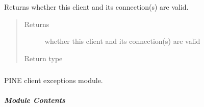 \documentclass[letterpaper,10pt,english]{sphinxmanual}
\begin{document}
\begin{fulllineitems}
\begin{fulllineitems}
\begin{quote}
\begin{description}
\end{description}\end{quote}

\end{fulllineitems}


\begin{fulllineitems}
\label{\detokenize{autoapi/pine/client/client/index:pine.client.client.LocalPineClient.is_valid}}
\sphinxAtStartPar
Returns whether this client and its connection(s) are valid.
\begin{quote}\begin{description}
\item[{Returns}] \leavevmode
\sphinxAtStartPar
whether this client and its connection(s) are valid

\item[{Return type}] \leavevmode
\sphinxAtStartPar
{}

\end{description}\end{quote}

\end{fulllineitems}


\end{fulllineitems}



\subparagraph{}
\label{\detokenize{autoapi/pine/client/exceptions/index:module-pine.client.exceptions}}\label{\detokenize{autoapi/pine/client/exceptions/index:pine-client-exceptions}}\label{\detokenize{autoapi/pine/client/exceptions/index::doc}}
\sphinxAtStartPar
PINE client exceptions module.


\subparagraph{Module Contents}
\label{\detokenize{autoapi/pine/client/exceptions/index:module-contents}}
\end{document}
